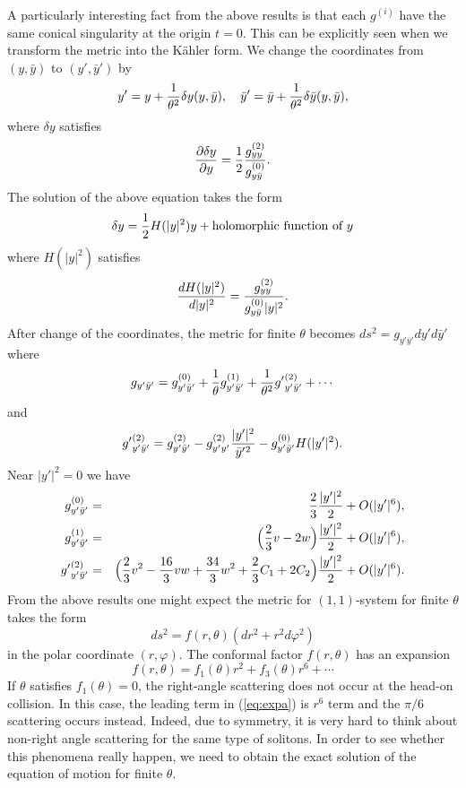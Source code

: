 \documentclass[a4paper,12pt]{article}
\begin{document}
A particularly interesting fact from the above results is that
each $g^{(i)}$ have the same conical singularity at the origin $t=0$.
This can be explicitly seen when we transform the metric into the K\"ahler
form.
We change the coordinates from $(y,\bar{y})$ to $(y',\bar{y}')$ by
\begin{equation}
 y'=y+{1\over\theta^2} \delta y(y,\bar{y}),\quad
 \bar{y}'=\bar{y}+{1\over\theta^2} \delta \bar{y}(y,\bar{y}),
\end{equation}
where $\delta y$ satisfies
\begin{equation}
 {\partial \delta y\over \partial y}={1\over 2}
{g^{(2)}_{yy}\over g^{(0)}_{y\bar{y}}}.
\end{equation}
The solution of the above equation takes the form
\begin{equation}
 \delta y={1\over 2} H(|y|^2)y+\mbox{holomorphic function of $y$}
\end{equation}
where $H(|y|^2)$ satisfies
\begin{equation}
 {d H(|y|^2)\over d |y|^2}={g^{(2)}_{yy}\over g^{(0)}_{y\bar{y}}|y|^2}.
\end{equation}
After change of the coordinates, the metric for finite $\theta$
becomes
$
 ds^2=g_{y'\bar{y}'}dy' d\bar{y}'
$
where
\begin{equation}
 g_{y'\bar{y}'}=g^{(0)}_{y'\bar{y}'}+{1\over\theta} g^{(1)}_{y'\bar{y}'}
+{1\over \theta^2} g'{}^{(2)}_{y'\bar{y}'}+\cdots
\end{equation}
and
\begin{equation}
  g'{}^{(2)}_{y'\bar{y}'}=g^{(2)}_{y'\bar{y}'}-g^{(2)}_{y'y'} {|y'|^2
\over \bar{y}'{}^2}-g^{(0)}_{y'\bar{y}'} H(|y'|^2).
\end{equation}
Near $|y'|^2=0$ we have
\begin{eqnarray}
 g^{(0)}_{y'\bar{y}'}&=& {2\over3}{|y'|^2\over2}+O(|y'|^6),\nonumber\\
g^{(1)}_{y'\bar{y}'}&=& \Bigl(
{2\over3}v-2w\Bigr){|y'|^2\over2}+O(|y'|^6),\nonumber\\
  g'{}^{(2)}_{y'\bar{y}'}&=&\Bigl(
{2\over 3}v^2-{16\over 3}vw+{34\over3}w^2+{2\over3}C_{1}+2C_{2}
\Bigr){|y'|^2\over2}+O(|y'|^6).
\end{eqnarray}
{}From the above results one might expect the metric for $(1,1)$-system
for finite $\theta$ takes the form
\begin{equation}
 ds^2=f(r,\theta)(dr^2+r^2d\varphi^2)
\end{equation}
in the polar coordinate $(r,\varphi)$.
The conformal factor $f(r,\theta)$ has an expansion
\begin{equation}
f(r,\theta)=f_{1}(\theta)r^2+f_{3}(\theta)r^6+\cdots
\label{eq:expa}
\end{equation}
If $\theta$ satisfies $f_{1}(\theta)=0$, the right-angle scattering does
not occur at the head-on collision. In this case, the leading term in
(\ref{eq:expa}) is $r^6$ term and
the ${\pi/6}$ scattering occurs instead.
Indeed, due to symmetry,  it is very hard to think about
non-right angle scattering for the same type of solitons.
In order to see whether this phenomena really happen,
we need to obtain the exact solution of
the equation of motion for finite $\theta$.
\end{document}
